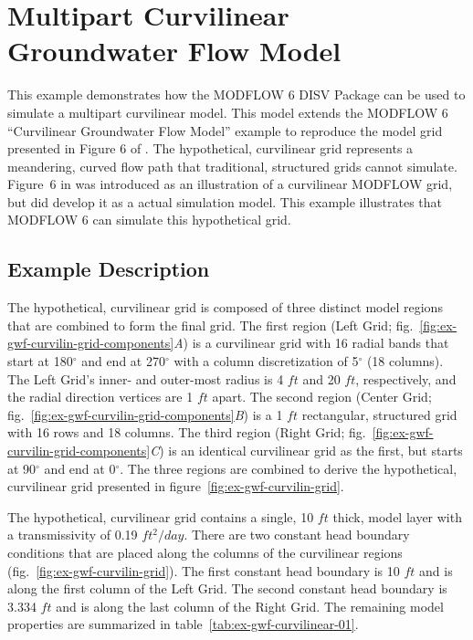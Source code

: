 \section{Multipart Curvilinear Groundwater Flow Model}
This example demonstrates how the MODFLOW 6 DISV Package can be used to simulate a multipart curvilinear model. This model extends the MODFLOW 6 ``Curvilinear Groundwater Flow Model'' example to reproduce the model grid presented in Figure 6 of \cite{romero2006grid}. The hypothetical, curvilinear grid represents a meandering, curved flow path that traditional, structured grids cannot simulate. Figure~6 in \cite{romero2006grid} was introduced as an illustration of a curvilinear MODFLOW grid, but did develop it as a actual simulation model. This example illustrates that MODFLOW 6 can simulate this hypothetical grid.


\subsection{Example Description}

The hypothetical, curvilinear grid is composed of three distinct model regions that are combined to form the final grid. The first region (Left Grid; fig.~\ref{fig:ex-gwf-curvilin-grid-components}\textit{A}) is a curvilinear grid with 16 radial bands that start at 180$^{\circ}$ and end at 270$^{\circ}$ with a column discretization of 5$^{\circ}$ (18 columns). The Left Grid's inner- and outer-most radius is 4 $ft$ and 20 $ft$, respectively, and the radial direction vertices are 1 $ft$ apart. The second region (Center Grid; fig.~\ref{fig:ex-gwf-curvilin-grid-components}\textit{B}) is a 1 $ft$ rectangular, structured grid with 16 rows and 18 columns. The third region (Right Grid; fig.~\ref{fig:ex-gwf-curvilin-grid-components}\textit{C}) is an identical curvilinear grid as the first, but starts at 90$^{\circ}$ and end at 0$^{\circ}$. The three regions are combined to derive the hypothetical, curvilinear grid presented in figure~\ref{fig:ex-gwf-curvilin-grid}.

The hypothetical, curvilinear grid contains a single, 10 $ft$ thick, model layer with a transmissivity of 0.19 $ft^2/day$. There are two constant head boundary conditions that are placed along the columns of the curvilinear regions (fig.~\ref{fig:ex-gwf-curvilin-grid}). The first constant head boundary is 10 $ft$ and is along the first column of the Left Grid. The second constant head boundary is 3.334 $ft$ and is along the last column of the Right Grid. The remaining model properties are summarized in table~\ref{tab:ex-gwf-curvilinear-01}.

